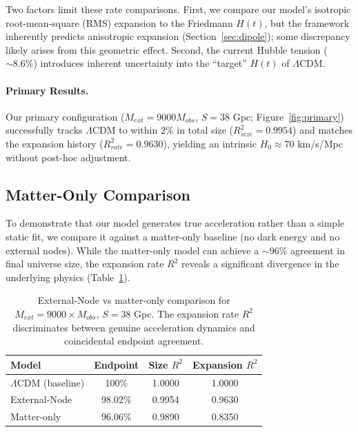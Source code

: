 \documentclass{article}
\begin{document}
Two factors limit these rate comparisons. First, we compare our model's isotropic root-mean-square (RMS) expansion to the Friedmann $H(t)$, but the framework inherently predicts anisotropic expansion (Section~\ref{sec:dipole}); some discrepancy likely arises from this geometric effect. Second, the current Hubble tension ($\sim 8.6\%$) introduces inherent uncertainty into the ``target'' $H(t)$ of $\Lambda$CDM. 

\paragraph{Primary Results.}
Our primary configuration ($M_{ext} = 9000 M_{obs}$, $S = 38$ Gpc; Figure~\ref{fig:primary}) successfully tracks $\Lambda$CDM to within 2\% in total size ($R^2_{size} = 0.9954$) and matches the expansion history ($R^2_{rate} = 0.9630$), yielding an intrinsic $H_0 \approx 70$ km/s/Mpc without post-hoc adjustment.

\subsection{Matter-Only Comparison}
\label{sec:matter-only}

To demonstrate that our model generates true acceleration rather than a simple static fit, we compare it against a matter-only baseline (no dark energy and no external nodes). While the matter-only model can achieve a $\sim$96\% agreement in final universe size, the expansion rate $R^2$ reveals a significant divergence in the underlying physics (Table~\ref{tab:comparison}).


\begin{table}[htbp]
\centering
\begin{tabular}{lccc}
\toprule
\textbf{Model} & \textbf{Endpoint} & \textbf{Size $R^2$} & \textbf{Expansion $R^2$} \\
\midrule
$\Lambda$CDM (baseline) & 100\% & 1.0000 & 1.0000 \\
External-Node & 98.02\% & 0.9954 & 0.9630 \\
Matter-only & 96.06\% & 0.9890 & 0.8350 \\
\bottomrule
\end{tabular}
\caption{External-Node vs matter-only comparison for $M_{ext} = 9000 \times M_{obs}$, $S = 38$ Gpc. The expansion rate $R^2$ discriminates between genuine acceleration dynamics and coincidental endpoint agreement.}
\label{tab:comparison}
\end{table}
\end{document}
